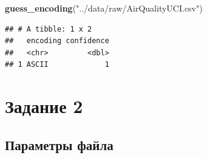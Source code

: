 \documentclass[
]{article}
\newenvironment{Shaded}{\begin{snugshade}}{\end{snugshade}}
\newcommand{\FunctionTok}[1]{\textcolor[rgb]{0.13,0.29,0.53}{\textbf{#1}}}
\newcommand{\NormalTok}[1]{#1}
\newcommand{\StringTok}[1]{\textcolor[rgb]{0.31,0.60,0.02}{#1}}
\begin{document}
\begin{Shaded}
\begin{Highlighting}[]
\FunctionTok{guess\_encoding}\NormalTok{(}\StringTok{"../data/raw/AirQualityUCI.csv"}\NormalTok{)}
\end{Highlighting}
\end{Shaded}

\begin{verbatim}
## # A tibble: 1 x 2
##   encoding confidence
##   <chr>         <dbl>
## 1 ASCII             1
\end{verbatim}

\section{Задание 2}\label{ux437ux430ux434ux430ux43dux438ux435-2}

\subsection{Параметры
файла}\label{ux43fux430ux440ux430ux43cux435ux442ux440ux44b-ux444ux430ux439ux43bux430}
\end{document}
